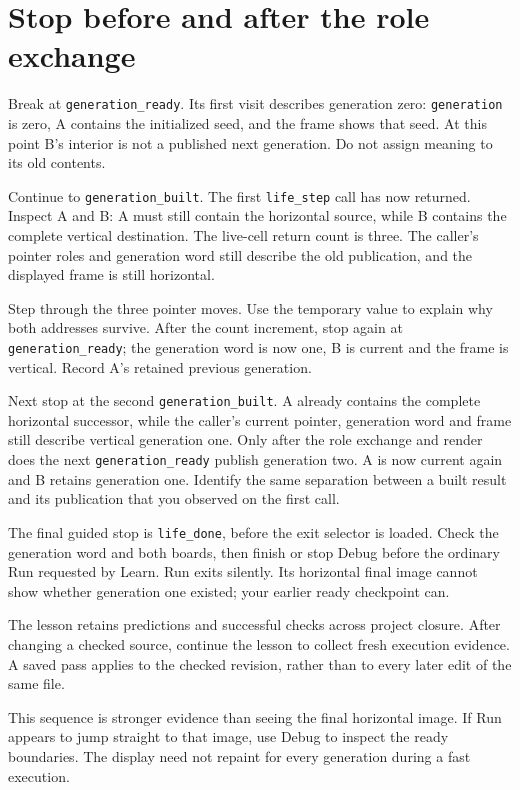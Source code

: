 \section{Stop before and after the role exchange}

Break at \texttt{generation\_ready}. Its first visit describes generation zero:
\texttt{generation} is zero, A contains the initialized seed, and the frame shows
that seed. At this point B's interior is not a published next generation. Do not
assign meaning to its old contents.

Continue to \texttt{generation\_built}. The first \texttt{life\_step} call has now
returned. Inspect A and B: A must still contain the horizontal source, while B
contains the complete vertical destination. The live-cell return count is three.
The caller's pointer roles and generation word still describe the old publication,
and the displayed frame is still horizontal.

Step through the three pointer moves. Use the temporary value to explain why both
addresses survive. After the count increment, stop again at
\texttt{generation\_ready}; the generation word is now one, B is current and the
frame is vertical. Record A's retained previous generation.

Next stop at the second \texttt{generation\_built}. A already contains the complete
horizontal successor, while the caller's current pointer, generation word and
frame still describe vertical generation one. Only after the role exchange and
render does the next \texttt{generation\_ready} publish generation two. A is now
current again and B retains generation one. Identify the same separation between
a built result and its publication that you observed on the first call.

The final guided stop is \texttt{life\_done}, before the exit selector is loaded.
Check the generation word and both boards, then finish or stop Debug before the
ordinary Run requested by Learn. Run exits silently. Its horizontal final image
cannot show whether generation one existed; your earlier ready checkpoint can.

The lesson retains predictions and successful checks across project closure.
After changing a checked source, continue the lesson to collect fresh execution
evidence. A saved pass applies to the checked revision, rather than to every
later edit of the same file.

This sequence is stronger evidence than seeing the final horizontal image. If Run
appears to jump straight to that image, use Debug to inspect the ready boundaries.
The display need not repaint for every generation during a fast execution.

